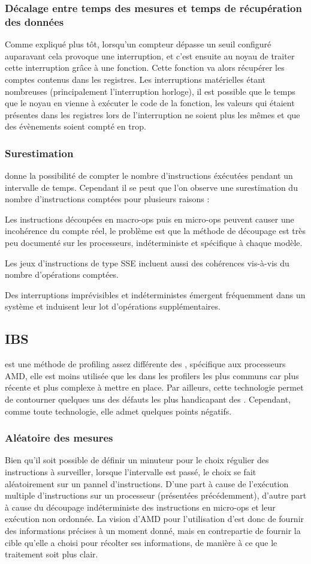 					\subsubsection{Décalage entre temps des mesures et temps de récupération des données}
						Comme expliqué plus tôt, lorsqu'un compteur dépasse un seuil configuré auparavant cela provoque une interruption, et c'est ensuite au noyau de traiter cette interruption grâce à une fonction. Cette fonction va alors récupérer les comptes contenus dans les registres. Les interruptions matérielles étant nombreuses (principalement l'interruption horloge), il est possible que le temps que le noyau en vienne à exécuter le code de la fonction, les valeurs qui étaient présentes dans les registres lors de l'interruption ne soient plus les mêmes et que des évènements soient compté en trop.
					\subsubsection{Surestimation}
						\PMC donne la possibilité de compter le nombre d'instructions éxécutées pendant un intervalle de temps. Cependant il se peut que l'on observe une surestimation du nombre d'instructions comptées pour plusieurs raisons : 
						\bitem
							\item{Les instructions découpées en macro-ops puis en micro-ops peuvent causer une incohérence du compte réel, le problème est que la méthode de découpage est très peu documenté sur les processeurs, indéterministe et spécifique à chaque modèle.}
							\item{Les jeux d'instructions de type SSE incluent aussi des cohérences vis-à-vis du nombre d'opérations comptées.}
							\item{Des interruptions imprévisibles et indéterministes émergent fréquemment dans un système et induisent leur lot d'opérations supplémentaires.}
						\eitem
				\subsection{IBS}
					\IBS est une méthode de profiling assez différente des \PMC, spécifique aux processeurs AMD, elle est moins utilisée que les \PMC dans les profilers les plus communs car plus récente et plus complexe à mettre en place. Par ailleurs, cette technologie permet de contourner quelques uns des défauts les plus handicapant des \PMC. Cependant, comme toute technologie, elle admet quelques points négatifs.
					\subsubsection{Aléatoire des mesures}
						Bien qu'il soit possible de définir un minuteur pour le choix régulier des instructions à surveiller, lorsque l'intervalle est passé, le choix se fait aléatoirement sur un pannel d'instructions. D'une part à cause de l'exécution multiple d'instructions sur un processeur (présentées précédemment), d'autre part à cause du découpage indéterministe des instructions en micro-ops et leur exécution non ordonnée. La vision d'AMD pour l'utilisation d'\IBS est donc de fournir des informations précises à un moment donné, mais en contrepartie de fournir la cible qu'elle a choisi pour récolter ses informations, de manière à ce que le traitement soit plus clair.
